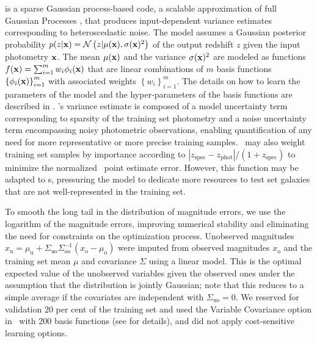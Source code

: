 \gpz \citep{Almosallam:16a,Almosallam:15b} is a sparse Gaussian process-based code, a scalable approximation of full Gaussian Processes \citep{Rasmussen:06}, that produces input-dependent variance estimates corresponding to heteroscedastic noise.
The model assumes a Gaussian posterior probability $p(z \vert {\mathbf{x}}) = \mathcal{N}\left(z \vert \mu({\mathbf{x}}), \sigma({\mathbf{x}})^{2}\right)$ of the output redshift $z$ given the input photometry ${\mathbf{x}}$.
The mean $\mu({\mathbf{x}})$ and the variance $\sigma({\mathbf{x}})^{2}$ are modeled as functions $f({\mathbf{x}}) = \sum_{i=1}^{m}w_{i}\phi_{i}({\mathbf{x}})$ that are linear combinations of $m$ basis functions $\left\{\phi_{i}({\mathbf{x}})\right\}_{i=1}^{m}$ with associated weights $\left\{w_{i}\right\}_{i=1}^{m}$.
The details on how to learn the parameters of the model and the hyper-parameters of the basis functions are described in \citet{Almosallam:15b}.
\gpz's variance estimate is composed of a model uncertainty term corresponding to sparsity of the training set photometry and a noise uncertainty term encompassing noisy photometric observations, enabling quantification of any need for more representative or more precise training samples.
\gpz\ may also weight training set samples by importance according to $|z_{\mathrm{spec}} - z_{\mathrm{phot}}| / (1+z_{\mathrm{spec}})$ to minimize the normalized \pz\ point estimate error.  However, this function may be adapted to \pzpdf s, pressuring the model to dedicate more resources to test set galaxies that are not well-represented in the training set.

To smooth the long tail in the distribution of magnitude errors, we use the logarithm of the magnitude errors, improving numerical stability and eliminating the need for constraints on the optimization process.
Unobserved magnitudes $x_{\mathrm{u}} = \mu_{\mathrm{u}} + \Sigma_{\mathrm{uo}}\Sigma_{\mathrm{oo}}^{-1}(x_{\mathrm{o}} - \mu_{\mathrm{o}})$ were imputed from observed magnitudes $x_{\mathrm{o}}$ and the training set mean $\mu$ and covariance $\Sigma$ using a linear model.
This is the optimal expected value of the unobserved variables given the observed ones under the assumption that the distribution is jointly Gaussian; note that this reduces to a simple average if the covariates are independent with $\Sigma_{\mathrm{uo}} = 0$.
We reserved for validation 20 per cent of the training set and used the Variable Covariance option in \gpz\ with 200 basis functions (see \citet{Almosallam:15b} for details), and did not apply cost-sensitive learning options.

